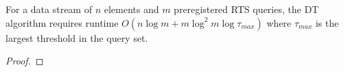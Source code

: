 \begin{theorem} For a data stream of $n$ elements and $m$ preregistered RTS queries, the DT algorithm requires runtime $O(n\log m + m\log^2m\log \tau_{max})$ where $\tau_{max}$ is the largest threshold in the query set. 
\end{theorem}
\begin{proof}
    
\end{proof}